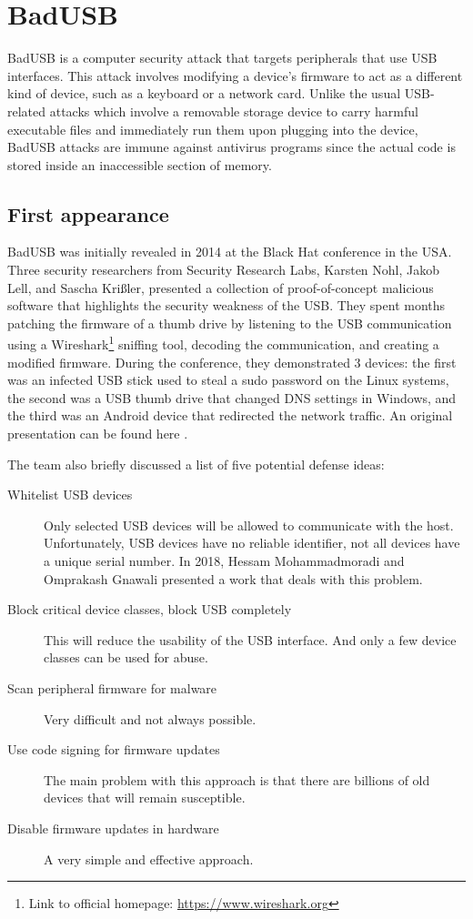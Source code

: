 
\chapter{BadUSB}
\label{ch:badusb}
BadUSB is a computer security attack that targets peripherals that use USB interfaces. This attack involves modifying a device's firmware to act as a different kind of device, such as a keyboard or a network card. Unlike the usual USB-related attacks which involve a removable storage device to carry harmful executable files and immediately run them upon plugging into the device, BadUSB attacks are immune against antivirus programs since the actual code is stored inside an inaccessible section of memory.

\section{First appearance}
\label{sec:badusb_first_appearance}
BadUSB was initially revealed in 2014 at the Black Hat conference in the USA. Three security researchers from Security Research Labs, Karsten Nohl, Jakob Lell, and Sascha Krißler, presented a collection of proof-of-concept malicious software that highlights the security weakness of the USB\cite{BlackHat}. They spent months patching the firmware of a thumb drive by listening to the USB communication using a Wireshark\footnote{Link to official homepage: \url{https://www.wireshark.org}} sniffing tool, decoding the communication, and creating a modified firmware. During the conference, they demonstrated 3 devices: the first was an infected USB stick used to steal a sudo password on the Linux systems, the second was a USB thumb drive that changed DNS settings in Windows, and the third was an Android device that redirected the network traffic. An original presentation can be found here \cite{srl_badusb}.

The team also briefly discussed a list of five potential defense ideas:
\begin{description}
    \item [Whitelist USB devices] Only selected USB devices will be allowed to communicate with the host. Unfortunately, USB devices have no reliable identifier, not all devices have a unique serial number. In 2018, Hessam Mohammadmoradi and Omprakash Gnawali presented a work that deals with this problem\cite{whitelistBadUSB2018}.
    \item [Block critical device classes, block USB completely] This will reduce the usability of the USB interface. And only a few device classes can be used for abuse.
    \item [Scan peripheral firmware for malware] Very difficult and not always possible.
    \item [Use code signing for firmware updates] The main problem with this approach is that there are billions of old devices that will remain susceptible.
    \item [Disable firmware updates in hardware] A very simple and effective approach.
\end{description}

